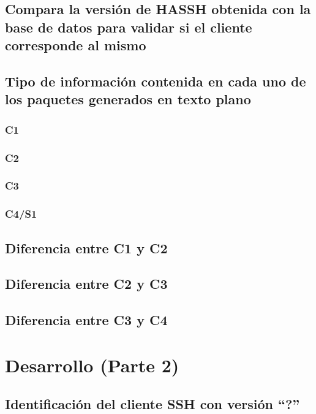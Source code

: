 \documentclass[letter,12pt]{article}
\begin{document}
\subsection{Compara la versión de HASSH obtenida con la base de datos para validar si el cliente corresponde al mismo}

\subsection{Tipo de información contenida en cada uno de los paquetes generados en texto plano}
\subsubsection{C1}
\subsubsection{C2}
\subsubsection{C3}
\subsubsection{C4/S1}

\subsection{Diferencia entre C1 y C2}

\subsection{Diferencia entre C2 y C3}

\subsection{Diferencia entre C3 y C4}

\newpage

\section{Desarrollo (Parte 2)}

\subsection{Identificación del cliente SSH con versión \textquotedblleft?\textquotedblright}
\end{document}
